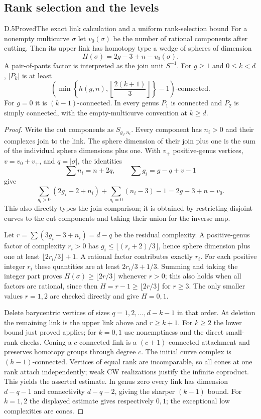 \subsection{Rank selection and the levels}

\begin{result}{D.5}{Proved}{The exact link calculation and a uniform rank-selection bound}
For a nonempty multicurve $\sigma$ let $v_0(\sigma)$ be the number of rational components after cutting. Then its upper link has homotopy type a wedge of spheres of dimension
\[
 H(\sigma)=2g-3+n-v_0(\sigma).
\]
A pair-of-pants factor is interpreted as the join unit $S^{-1}$. For $g\geq1$ and $0\leq k<d$, $|P_k|$ is at least
\[
 \left(\min\left\{h(g,n),\left\lfloor\frac{2(k+1)}3\right\rfloor\right\}-1\right)\text{-connected}.
\]
For $g=0$ it is $(k-1)$-connected. In every genus $P_1$ is connected and $P_2$ is simply connected, with the empty-multicurve convention at $k\geq d$.
\end{result}
\begin{proof}
Write the cut components as $S_{g_i,n_i}$. Every component has $n_i>0$ and their complexes join to the link. The sphere dimension of their join plus one is the sum of the individual sphere dimensions plus one. With $v_+$ positive-genus vertices, $v=v_0+v_+$, and $q=|\sigma|$, the identities
\[
 \sum n_i=n+2q,\qquad \sum g_i=g-q+v-1
\]
give
\[
 \sum_{g_i>0}(2g_i-2+n_i)+\sum_{g_i=0}(n_i-3)-1
 =2g-3+n-v_0.
\]
This also directly types the join comparison; it is obtained by restricting disjoint curves to the cut components and taking their union for the inverse map.

Let $r=\sum(3g_i-3+n_i)=d-q$ be the residual complexity. A positive-genus factor of complexity $r_i>0$ has $g_i\leq\lfloor(r_i+2)/3\rfloor$, hence sphere dimension plus one at least $\lfloor2r_i/3\rfloor+1$. A rational factor contributes exactly $r_i$. For each positive integer $r_i$ these quantities are at least $2r_i/3+1/3$. Summing and taking the integer part proves $H(\sigma)\geq\lfloor2r/3\rfloor$ whenever $r>0$; this also holds when all factors are rational, since then $H=r-1\geq\lfloor2r/3\rfloor$ for $r\geq3$. The only smaller values $r=1,2$ are checked directly and give $H=0,1$.

Delete barycentric vertices of sizes $q=1,2,\ldots,d-k-1$ in that order. At deletion the remaining link is the upper link above and $r\geq k+1$. For $k\geq2$ the lower bound just proved applies; for $k=0,1$ use nonemptiness and the direct small-rank checks. Coning a $c$-connected link is a $(c+1)$-connected attachment and preserves homotopy groups through degree $c$. The initial curve complex is $(h-1)$-connected. Vertices of equal rank are incomparable, so all cones at one rank attach independently; weak CW realizations justify the infinite coproduct. This yields the asserted estimate. In genus zero every link has dimension $d-q-1$ and connectivity $d-q-2$, giving the sharper $(k-1)$ bound. For $k=1,2$ the displayed estimate gives respectively $0,1$; the exceptional low complexities are cones.
\end{proof}

